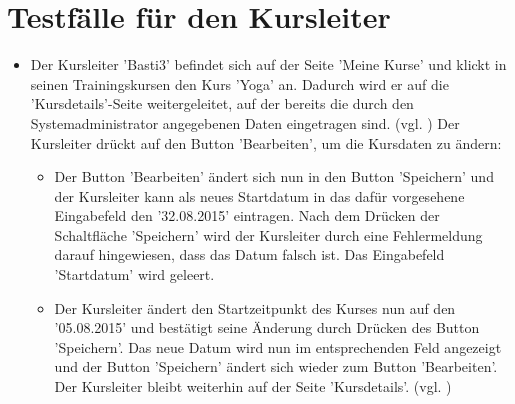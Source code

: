 \documentclass[a4paper]{scrreprt}
\newcounter{Lc}
\newcounter{Hc}
\newcommand{\stepHc}{\stepcounter{Hc}\setcounter{Lc}{0}}
\begin{document}
	\section{Testfälle für den Kursleiter}
		\stepHc
		\begin{itemize}
			\item {} 
			Der Kursleiter 'Basti3' befindet sich auf der Seite 'Meine Kurse' und klickt in seinen Trainingskursen den Kurs 'Yoga' an. Dadurch wird er auf die 'Kursdetails'-Seite weitergeleitet, auf der bereits die durch den Systemadministrator angegebenen Daten eingetragen sind. (vgl. ) Der Kursleiter drückt auf den Button 'Bearbeiten', um die Kursdaten zu ändern:
			\begin{itemize}
				\item Der Button 'Bearbeiten' ändert sich nun in den Button 'Speichern' und der Kursleiter kann als neues Startdatum in das dafür vorgesehene Eingabefeld den '32.08.2015' eintragen. Nach dem Drücken der Schaltfläche 'Speichern' wird der Kursleiter durch eine Fehlermeldung darauf hingewiesen, dass das Datum falsch ist. Das Eingabefeld 'Startdatum' wird geleert.
				
				\item Der Kursleiter ändert den Startzeitpunkt des Kurses nun auf den '05.08.2015' und bestätigt seine Änderung durch Drücken des Button 'Speichern'. Das neue Datum wird nun im entsprechenden Feld angezeigt und der Button 'Speichern' ändert sich wieder zum Button 'Bearbeiten'. Der Kursleiter bleibt weiterhin auf der Seite 'Kursdetails'. (vgl. )
			\end{itemize}
			

\end{itemize}
\end{document}
